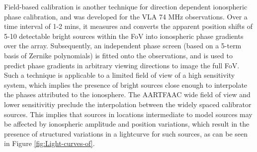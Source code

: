 \documentclass{aa}
\begin{document}
Field-based   calibration\citep{cottona2004beyond}  is  another   technique  for
direction dependent ionospheric phase calibration, and was developed for the VLA
74 MHz observations. Over a time  interval of 1-2 mins, it measures and converts
the apparent  position shifts of 5-10  detectable bright sources  within the FoV
into ionospheric  phase gradients over  the array. Subsequently,  an independent
phase screen (based on a 5-term basis of Zernike polynomials) is fitted onto the
observations,  and is  used  to  predict phase  gradients  in arbitrary  viewing
directions to  image the full FoV. Such  a technique is applicable  to a limited
field of view of a high sensitivity system, which implies the presence of bright
sources close enough to interpolate the phases attributed to the ionosphere. The
AARTFAAC wide  field of view  and lower sensitivitiy preclude  the interpolation
between  the widely  spaced calibrator  sources.  This implies  that sources  in
locations intermediate to model sources may be affected by ionospheric amplitude
and position variations,  which result in the presence  of structured variations
in   a   lightcurve   for   such   sources,   as   can   be   seen   in   Figure
\ref{fig:Light-curves-of}.
\end{document}
